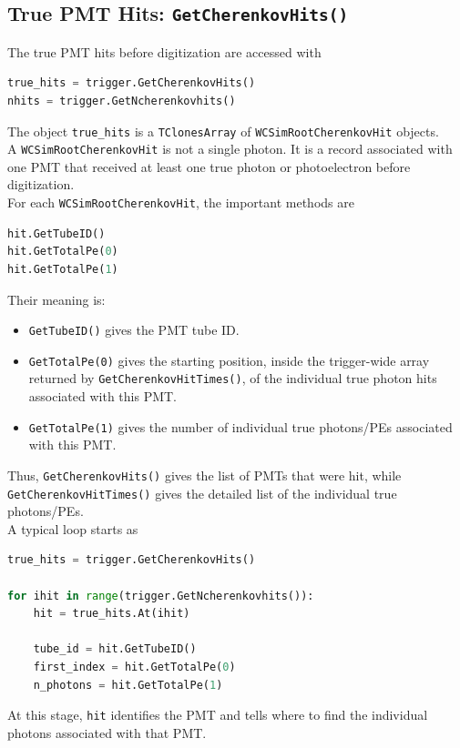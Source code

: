 \documentclass{article}
\numberwithin{table}{subsection}
\numberwithin{figure}{subsection}
\numberwithin{equation}{subsection}
\numberwithin{footnote}{subsection}
\begin{document}
\subsection{True PMT Hits: \texttt{GetCherenkovHits()}}

The true PMT hits before digitization are accessed with

\begin{lstlisting}[language=python]
true_hits = trigger.GetCherenkovHits()
nhits = trigger.GetNcherenkovhits()
\end{lstlisting}
The object \texttt{true\_hits} is a \texttt{TClonesArray} of
\texttt{WCSimRootCherenkovHit} objects.\\
A \texttt{WCSimRootCherenkovHit} is not a single photon. It is a record
associated with one PMT that received at least one true photon or photoelectron
before digitization.\\
For each \texttt{WCSimRootCherenkovHit}, the important methods are

\begin{lstlisting}[language=python]
hit.GetTubeID()
hit.GetTotalPe(0)
hit.GetTotalPe(1)
\end{lstlisting}
Their meaning is:

\begin{itemize}
    \item \texttt{GetTubeID()} gives the PMT tube ID.
    \item \texttt{GetTotalPe(0)} gives the starting position, inside the
    trigger-wide array returned by \texttt{GetCherenkovHitTimes()}, of the
    individual true photon hits associated with this PMT.
    \item \texttt{GetTotalPe(1)} gives the number of individual true photons/PEs
    associated with this PMT.
\end{itemize}
Thus, \texttt{GetCherenkovHits()} gives the list of PMTs that were hit, while
\texttt{GetCherenkovHitTimes()} gives the detailed list of the individual true
photons/PEs.\\
\newline
A typical loop starts as
\begin{lstlisting}[language=python]
true_hits = trigger.GetCherenkovHits()

for ihit in range(trigger.GetNcherenkovhits()):
    hit = true_hits.At(ihit)

    tube_id = hit.GetTubeID()
    first_index = hit.GetTotalPe(0)
    n_photons = hit.GetTotalPe(1)
\end{lstlisting}
At this stage, \texttt{hit} identifies the PMT and tells where to find the
individual photons associated with that PMT.
\end{document}
